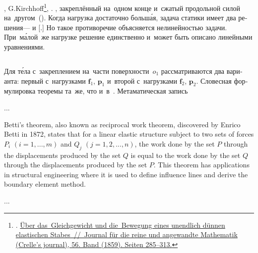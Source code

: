 

\begin{otherlanguage}{russian}

,  G.\:Kirchhoff\footnote{. \href{https://opacplus.bsb-muenchen.de/Vta2/bsb10525510/bsb:2960444?page=291}{Über das~Gleich\-gewicht und die~Bewe\-gung eines unendlich dünnen elastischen Stabes~//~Journal für die reine und angewandte Mathematik (Crelle’s journal), 56. Band (1859). Seiten 285\hbox{--}313.}}\hbox{\hspace{-0.5ex},} .
  , закреплённый на~одном конце и~сжатый продольной силой на~другом~(). Когда нагрузка достаточно больш\'{а}я, задача статики имеет два решения\:---  и [.]
Но такое противоречие объясняется нелинейностью задачи. При~м\'{а}лой~же нагрузке решение единственно и~может быть описано линейными уравнениями.

\subsection*{}

Для т\'{е}ла с~закреплением на~части поверхности~${o_1}$ рассматриваются два варианта: первый с~нагрузками $\bm{f}_1$, $\bm{p}_1$ и~второй с~нагрузками $\bm{f}_2$, $\bm{p}_2$. Словесная формулировка теоремы та~же, что и~в~. Метаматическая запись

...

{\small
Betti’s theorem, also known as reciprocal work theorem, discovered by Enrico Betti in 1872, states that for a linear elastic structure subject to two sets of forces ${P_i}$ ${(i = 1, ..., m)}$ and ${Q_j}$ ${(j = 1, 2, ..., n)}$, the work done by the set $P$ through the displacements produced by the set $Q$ is equal to the work done by the set $Q$ through the displacements produced by the set $P$. This theorem has applications in structural engineering where it is used to define influence lines and derive the boundary element method.
\par}

...


\end{otherlanguage}
